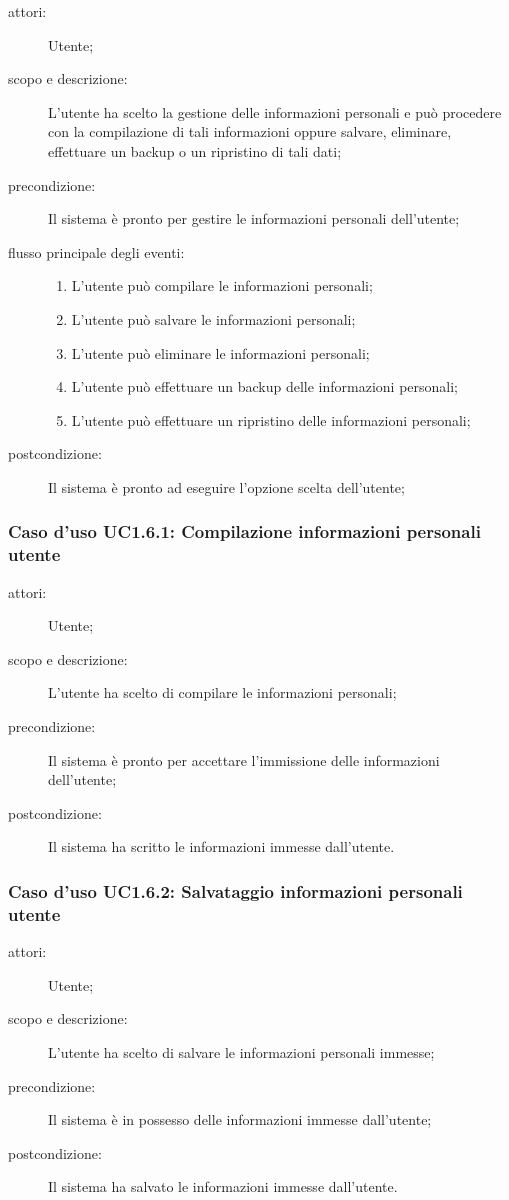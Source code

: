 \begin{description}
\item[attori:] Utente;
\item[scopo e descrizione:] L'utente ha scelto la gestione delle informazioni personali e può procedere con la compilazione di tali informazioni oppure salvare, eliminare, effettuare un backup o un ripristino di tali dati;
\item[precondizione:] Il sistema è pronto per gestire le informazioni personali dell'utente;
\item[flusso principale degli eventi:] \hfill
	\begin{enumerate}
	\item L'utente può compilare le informazioni personali;
	\item L'utente può salvare le informazioni personali;
	\item L'utente può eliminare le informazioni personali;
	\item L'utente può effettuare un backup delle informazioni personali;
	\item L'utente può effettuare un ripristino delle informazioni personali;
	\end{enumerate}
\item[postcondizione:] Il sistema è pronto ad eseguire l'opzione scelta dell'utente;
\end{description}

\subsubsection{Caso d'uso UC1.6.1: Compilazione informazioni personali utente}
\begin{description}
\item[attori:] Utente;
\item[scopo e descrizione:] L'utente ha scelto di compilare le informazioni personali;
\item[precondizione:] Il sistema è pronto per accettare l'immissione delle informazioni dell'utente;
\item[postcondizione:] Il sistema ha scritto le informazioni immesse dall'utente.
\end{description}

\subsubsection{Caso d'uso UC1.6.2: Salvataggio informazioni personali utente}
\begin{description}
\item[attori:] Utente;
\item[scopo e descrizione:] L'utente ha scelto di salvare le informazioni personali immesse;
\item[precondizione:] Il sistema è in possesso delle informazioni immesse dall'utente;
\item[postcondizione:] Il sistema ha salvato le informazioni immesse dall'utente.
\end{description}

